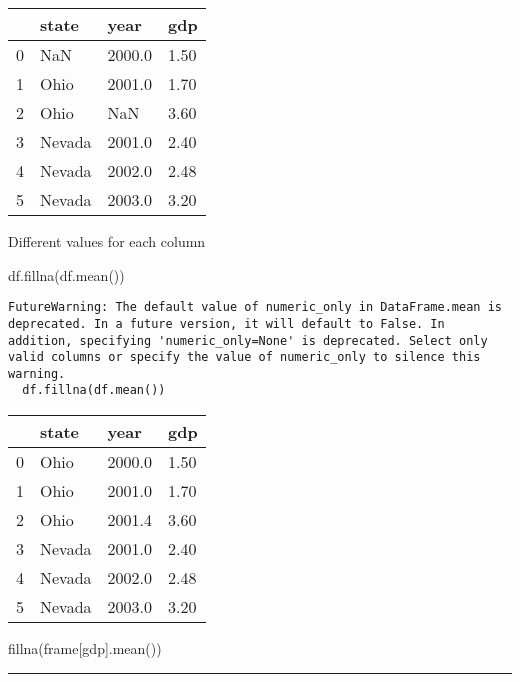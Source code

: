 \documentclass[
  letterpaper,
  DIV=11,
  numbers=noendperiod]{scrreprt}
\newenvironment{Shaded}{\begin{snugshade}}{\end{snugshade}}
\newcommand{\NormalTok}[1]{\textcolor[rgb]{0.00,0.23,0.31}{#1}}
\newcommand{\StringTok}[1]{\textcolor[rgb]{0.13,0.47,0.30}{#1}}
\begin{document}
\begin{longtable}[]{@{}llll@{}}
\toprule()
& state & year & gdp \\
\midrule()
\endhead
0 & NaN & 2000.0 & 1.50 \\
1 & Ohio & 2001.0 & 1.70 \\
2 & Ohio & NaN & 3.60 \\
3 & Nevada & 2001.0 & 2.40 \\
4 & Nevada & 2002.0 & 2.48 \\
5 & Nevada & 2003.0 & 3.20 \\
\bottomrule()
\end{longtable}

Different values for each column

\begin{Shaded}
\begin{Highlighting}[]
\NormalTok{df.fillna(df.mean())}
\end{Highlighting}
\end{Shaded}

\begin{verbatim}
FutureWarning: The default value of numeric_only in DataFrame.mean is deprecated. In a future version, it will default to False. In addition, specifying 'numeric_only=None' is deprecated. Select only valid columns or specify the value of numeric_only to silence this warning.
  df.fillna(df.mean())
\end{verbatim}

\begin{longtable}[]{@{}llll@{}}
\toprule()
& state & year & gdp \\
\midrule()
\endhead
0 & Ohio & 2000.0 & 1.50 \\
1 & Ohio & 2001.0 & 1.70 \\
2 & Ohio & 2001.4 & 3.60 \\
3 & Nevada & 2001.0 & 2.40 \\
4 & Nevada & 2002.0 & 2.48 \\
5 & Nevada & 2003.0 & 3.20 \\
\bottomrule()
\end{longtable}

\begin{Shaded}
\begin{Highlighting}[]
\NormalTok{fillna(frame[}\StringTok{\textquotesingle{}gdp\textquotesingle{}}\NormalTok{].mean())}
\end{Highlighting}
\end{Shaded}

\begin{center}\rule{0.5\linewidth}{0.5pt}\end{center}
\end{document}
